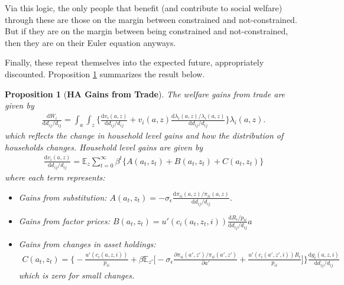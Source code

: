 \documentclass[12pt,pdftex]{article}
\newtheorem{prp}{Proposition}
\begin{document}
\begin{onehalfspacing}
Via this logic, the only people that benefit (and contribute to social welfare) through these are those on the margin between constrained and not-constrained. But if they are on the margin between being constrained and not-constrained, then they are on their Euler equation anyways.

Finally, these repeat themselves into the expected future, appropriately discounted. Proposition \ref{prp:gains-trade} summarizes the result below.

\begin{prp}[\textbf{HA Gains from Trade}] \label{prp:gains-trade} The welfare gains from trade are given by
{\footnotesize
\begin{align}
\frac{\mathrm{d} W_{i}}{\mathrm{d} d_{ij} / d_{ij}} = \int_{a}\int_{z}  \bigg \{ \frac{\mathrm{d} v_i(a, z)}{\mathrm{d} d_{ij} / d_{ij}}  + v_{i}(a,z) \frac{\mathrm{d} \lambda_{i}(a,z)/ \lambda_{i}(a,z)}{\mathrm{d} d_{ij} / d_{ij}}  \bigg \} \lambda_{i}(a,z).
\nonumber
\end{align}
}which reflects the change in household level gains and how the distribution of households changes. Household level gains are given by
{\footnotesize
\begin{align}
\nonumber
\frac{\mathrm{d} v_i(a, z)}{\mathrm{d} d_{ij} / d_{ij}} = \mathbb{E}_{z} \sum_{t = 0}^{\infty} \beta^{t} \bigg \{ A(a_{t},z_{t}) + B(a_{t},z_{t}) + C(a_{t},z_{t}) \bigg \}
\end{align}
}where each term represents:
\begin{itemize}
\item Gains from substitution: $A(a_{t},z_{t}) = -\sigma_{\epsilon} \frac{\mathrm{d} \pi_{ii}(a,z) / \pi_{ii}(a,z)}{\mathrm{d}d_{ij} / d_{ij}}$.

\item Gains from factor prices: $B(a_{t},z_{t}) = u'(c_{i}(a_{t},z_{t},i))\frac{\mathrm{d} R_{i}/p_{ii}}{\mathrm{d} d_{ij} / d_{ij}}a$

\item Gains from changes in asset holdings:
{\footnotesize
\begin{align}
\nonumber
C(a_{t},z_{t}) = \bigg \{- \frac{u'(c_{i}(a,z,i))}{p_{ii}} + \beta \mathbb{E}_{z'} \bigg [-\sigma_{\epsilon} \frac{\partial \pi_{ii}(a',z') / \pi_{ii}(a',z')}{\partial a'} + \frac{u'(c_{i}(a',z',i))R_{i}}{p_{ii}} \bigg ] \bigg \}\frac{\mathrm{d} g_{i}(a,z,i)}{\mathrm{d} d_{ij} / d_{ij}}
\end{align}}
which is zero for small changes.
\end{itemize}
\end{prp}


\end{onehalfspacing}
\end{document}
